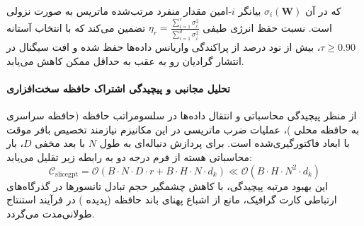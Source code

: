 که در آن $\sigma_i(\mathbf{W})$ بیانگر $i$-امین مقدار منفرد مرتب‌شده ماتریس به صورت نزولی است. نسبت حفظ انرژی طیفی $\eta_r = \frac{\sum_{i=1}^r \sigma_i^2}{\sum_{i=1}^{d} \sigma_i^2}$ تضمین می‌کند که با انتخاب آستانه $\tau \ge 0.90$، بیش از نود درصد از پراکندگی واریانس داده‌ها حفظ شده و افت سیگنال در انتشار گرادیان رو به عقب به حداقل ممکن کاهش می‌یابد.

\paragraph{تحلیل مجانبی و پیچیدگی اشتراک حافظه سخت‌افزاری}
از منظر پیچیدگی محاسباتی و انتقال داده‌ها در سلسومراتب حافظه (حافظه سراسری  به حافظه محلی )، عملیات ضرب ماتریسی در این مکانیزم نیازمند تخصیص بافر موقت با ابعاد فاکتورگیری‌شده است. برای پردازش دنباله‌ای به طول $N$ با بعد مخفی $D$، بار محاسباتی هسته از فرم درجه دو به رابطه زیر تقلیل می‌یابد:
\begin{equation}
\label{eq:complexity_slicegpt}
\mathcal{C}_{\text{slicegpt}} = \mathcal{O}\left( B \cdot N \cdot D \cdot r + B \cdot H \cdot N \cdot d_k \right) \ll \mathcal{O}\left( B \cdot H \cdot N^2 \cdot d_k \right)
\end{equation}
این بهبود مرتبه پیچیدگی، با کاهش چشمگیر حجم تبادل تانسورها در گذرگاه‌های ارتباطی کارت گرافیک، مانع از اشباع پهنای باند حافظه (پدیده ) در فرآیند استنتاج طولانی‌مدت می‌گردد.

